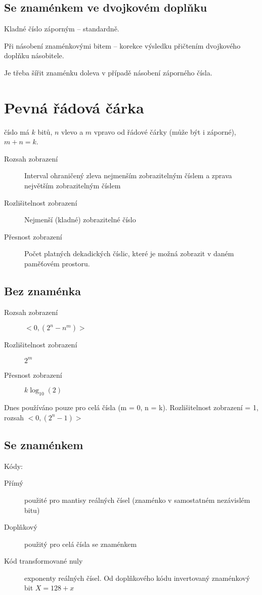 \documentclass[a4paper, 11pt]{report}
\begin{document}
\subsection{Se znaménkem ve dvojkovém doplňku}

Kladné číslo záporným -- standardně.

Při násobení znaménkovými bitem -- korekce výsledku přičtením dvojkového doplňku násobitele.

Je třeba šířit znaménku doleva v případě násobení záporného čísla.

\section{Pevná řádová čárka}

číslo má $k$ bitů, $n$ vlevo a $m$ vpravo od řádové čárky (může být i záporné), $m+n = k$.

\begin{description}
	\item[Rozsah zobrazení] Interval ohraničený zleva nejmenším zobrazitelným číslem a zprava největším zobrazitelným číslem
	\item[Rozlišitelnost zobrazení] Nejmenší (kladné) zobrazitelné číslo
	\item[Přesnost zobrazení] Počet platných dekadických číslic, které je možná zobrazit v daném paměťovém prostoru.
\end{description}

\subsection{Bez znaménka}

\begin{description}
	\item[Rozsah zobrazení] $< 0, (2^n - n^m) >$
	\item[Rozlišitelnost zobrazení] $2^m$
	\item[Přesnost zobrazení] $k \log_{10}(2)$
\end{description}

Dnes používáno pouze pro celá čísla (m = 0, n = k). Rozlišitelnost zobrazení = 1, rozsah $<0, (2^n-1)>$

\subsection{Se znaménkem}

Kódy:
\begin{description}
	\item[Přímý] použité pro mantisy reálných čísel (znaménko v samostatném nezávislém bitu)
	\item[Doplňkový] použitý pro celá čísla se znaménkem
	\item[Kód transformované nuly] exponenty reálných čísel. Od doplňkového kódu invertovaný znaménkový bit $X = 128 + x$
\end{description}
\end{document}
